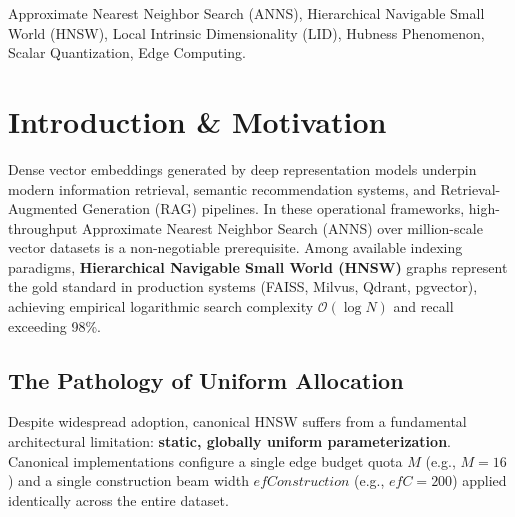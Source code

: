 \documentclass[conference,10pt]{IEEEtran}
\begin{document}
\begin{abstract}
\end{abstract}

\begin{IEEEkeywords}
Approximate Nearest Neighbor Search (ANNS), Hierarchical Navigable Small World (HNSW), Local Intrinsic Dimensionality (LID), Hubness Phenomenon, Scalar Quantization, Edge Computing.
\end{IEEEkeywords}

\section{Introduction \& Motivation}
Dense vector embeddings generated by deep representation models underpin modern information retrieval, semantic recommendation systems, and Retrieval-Augmented Generation (RAG) pipelines. In these operational frameworks, high-throughput Approximate Nearest Neighbor Search (ANNS) over million-scale vector datasets is a non-negotiable prerequisite. Among available indexing paradigms, \textbf{Hierarchical Navigable Small World (HNSW)} graphs \cite{malkov2020hnsw} represent the gold standard in production systems (FAISS, Milvus, Qdrant, pgvector), achieving empirical logarithmic search complexity $\mathcal{O}(\log N)$ and recall exceeding 98\%.

\subsection{The Pathology of Uniform Allocation}
Despite widespread adoption, canonical HNSW suffers from a fundamental architectural limitation: \textbf{static, globally uniform parameterization}. Canonical implementations configure a single edge budget quota $M$ (e.g., $M=16$) and a single construction beam width $efConstruction$ (e.g., $efC=200$) applied identically across the entire dataset.
\end{document}
